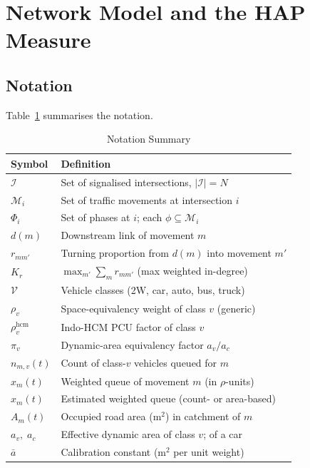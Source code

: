 \documentclass[journal]{IEEEtran}
\newcommand{\vc}{\mathcal{V}}
\newcommand{\Mset}{\mathcal{M}}
\begin{document}
\section{Network Model and the HAP Measure}
\label{sec:model}

\subsection{Notation}
Table~\ref{tab:notation} summarises the notation.

\begin{table}[htbp]
\caption{Notation Summary}
\label{tab:notation}
\centering
\footnotesize
\begin{tabularx}{\columnwidth}{@{}lX@{}}
\toprule
Symbol & Definition \\
\midrule
$\mathcal{I}$      & Set of signalised intersections, $|\mathcal{I}|=N$ \\
$\Mset_i$          & Set of traffic movements at intersection $i$ \\
$\Phi_i$           & Set of phases at $i$; each $\phi \subseteq \Mset_i$ \\
$d(m)$             & Downstream link of movement $m$ \\
$r_{mm'}$          & Turning proportion from $d(m)$ into movement $m'$ \\
$K_r$              & $\max_{m'}\sum_{m} r_{mm'}$ (max weighted in-degree) \\
$\vc$              & Vehicle classes (2W, car, auto, bus, truck) \\
$\rho_v$           & Space-equivalency weight of class $v$ (generic) \\
$\rho^{\mathrm{hcm}}_v$ & Indo-HCM PCU factor of class $v$ \\
$\pi_v$            & Dynamic-area equivalency factor $a_v/a_c$ \\
$n_{m,v}(t)$       & Count of class-$v$ vehicles queued for $m$ \\
$x_m(t)$           & Weighted queue of movement $m$ (in $\rho$-units) \\
$\hat{x}_m(t)$     & Estimated weighted queue (count- or area-based) \\
$A_m(t)$           & Occupied road area (m$^2$) in catchment of $m$ \\
$a_v,\;a_c$        & Effective dynamic area of class $v$; of a car \\
$\bar{a}$          & Calibration constant (m$^2$ per unit weight) \\

\end{tabularx}
\end{table}
\end{document}
